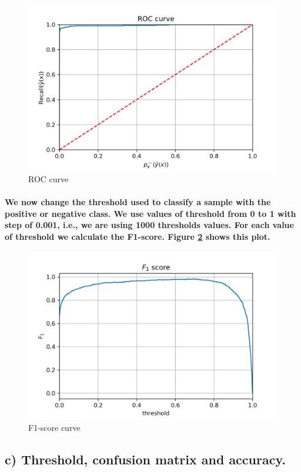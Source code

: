 \documentclass[a4paper]{article}    %
\begin{document}
\begin{figure}[H]
    \centering
    \includegraphics[width=12cm]{ROC}
    \caption{ROC curve}
    \label{fig:ex1-roc}
\end{figure}

\paragraph{We now change the threshold used to classify a sample with the positive or negative class. We use values of threshold from 0 to 1 with step of 0.001, i.e., we are using 1000 thresholds values. For each value of threshold we calculate the F1-score. Figure \ref{fig:ex1-f1_score} shows this plot.}

\begin{figure}[H]
    \centering
    \includegraphics[width=12cm]{F1_score}
    \caption{F1-score curve}
    \label{fig:ex1-f1_score}
\end{figure}

\subsection{c) Threshold, confusion matrix and accuracy.}
\end{document}
